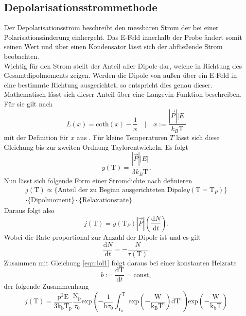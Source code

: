\subsection{Depolarisationsstrommethode}
Der Depolarisationsstrom beschreibt den messbaren Strom der bei einer Polarisationsänderung einhergeht. Das E-Feld innerhalb der Probe ändert somit seinen Wert und über einen Kondensator lässt sich der abfließende Strom beobachten.
\\
Wichtig für den Strom stellt der Anteil aller Dipole dar, welche in Richtung des Gesamtdipolmoments zeigen. Werden die Dipole von außen über ein E-Feld in eine bestimmte Richtung ausgerichtet, so entspricht dies genau
dieser. Mathematisch lässt sich dieser Anteil über eine Langevin-Funktion beschreiben. Für sie gilt nach \cite{KROGER201577}
\begin{equation}
L(x) = \text{coth}(x) - \frac{1}{x} \quad \Biggl| \quad x := \frac{|\vec{P}||E|}{k_{B} \text{T}}
\end{equation}
mit der Definition für $x$ aus \cite{altskript}. Für kleine Temperaturen $T$ lässt sich diese Gleichung bis zur zweiten Ordnung Taylorentwickeln.
Es folgt
\begin{equation}
y(\text{T}) = \frac{|\vec{P}||E|}{3k_{B} \text{T}}.
\end{equation}
Nun lässt sich folgende Form einer Stromdichte nach \cite{fuller} definieren
\begin{multline}
j(\text{T}) \propto \{\text{Anteil der zu Beginn ausgerichteten Dipole} y(\text{T} = \text{T}_P)\} \\ \cdot \{\text{Dipolmoment}\} \cdot \{\text{Relaxationsrate}\}.
\end{multline}
Daraus folgt also
\begin{equation}
j(\text{T}) = y(\text{T}_P) |\vec{P}| \left(\frac{\text{d}N}{\text{d}t}\right).
\end{equation}
Wobei die Rate proportional zur Anzahl der Dipole ist und es gilt
\begin{equation}
    \frac{\text{d}N}{\text{d}t} = - \frac{N}{\tau(\text{T})}.
\end{equation}
Zusammen mit Gleichung \eqref{eqn:lol1} folgt daraus bei einer konstanten Heizrate 
\begin{equation}
b := \frac{\text{dT}}{\text{d}t} = \text{const},
\end{equation}
der folgende Zusammenhang
\begin{equation}
    j \left( \text{T} \right) = \frac{\text{p}^2 \text{E}}{3\text{k}_{\text{b}}\text{T}_{\text{p}}} \frac{\text{N}_{\text{p}}}{\tau_0} \text{exp} \left( -\frac{1}{\text{b}\tau_0} \int^{\text{T}}_{\text{T}_0}  \text{exp} \left( - \frac{\text{W}}{\text{k}_{\text{B}}\text{T'}} \right) \text{dT'} \right) \text{exp} \left(-\frac{\text{W}}{\text{k}_{\text{b}}\text{T}} \right)
    \label{killme}
\end{equation}

